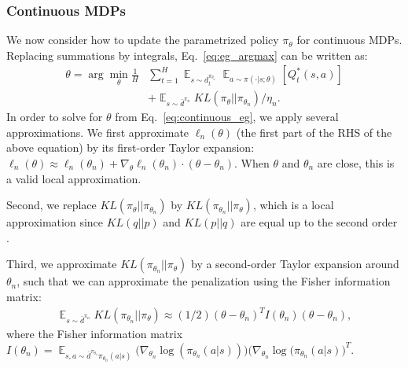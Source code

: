 \documentclass{article}
\begin{document}

\subsubsection{Continuous MDPs}
We now consider how to update the parametrized policy $\pi_{\theta}$ for continuous MDPs. Replacing summations by integrals, Eq.~\ref{eq:eg_argmax} can be written as:
\begin{align}
\label{eq:continuous_eg}
\theta = \arg\min_{\theta}\frac{1}{H}& \sum_{t=1}^H  \mathop{\mathbb{E}}_{s\sim d_t^{\pi_{\theta_n}}}\mathop{\mathbb{E}}_{a\sim\pi(\cdot|s;\theta)}[Q_t^*(s,a)] \nonumber\\
& + \mathop{\mathbb{E}}_{s\sim\bar{d}^{\pi_n}}KL(\pi_{\theta} ||\pi_{\theta_n})/\eta_{n}.
\end{align} 
In order to solve for $\theta$ from Eq.~\ref{eq:continuous_eg}, we apply several approximations. We first approximate $\ell_n(\theta)$ (the first part of the RHS of the above equation) by its first-order Taylor expansion: $\ell_n(\theta)\approx \ell_n(\theta_n) + \nabla_{\theta}\ell_n(\theta_n) \cdot (\theta - \theta_n)$. When $\theta$ and $\theta_n$ are close, this is a valid local approximation. 

Second, we replace $KL(\pi_{\theta}||\pi_{\theta_n})$ by $KL(\pi_{\theta_n}||\pi_{\theta})$, which is a local approximation since $KL(q||p)$ and $KL(p||q)$ are equal up to the second order \cite{kakade2002approximately,schulman2015trust}.

Third, we approximate $KL(\pi_{\theta_n}||\pi_{\theta})$ by a second-order Taylor expansion around $\theta_n$, such that we can approximate the penalization using the Fisher information matrix:
\begin{align}
\mathop{\mathbb{E}}_{s\sim\bar{d}^{\pi_n}}KL(\pi_{\theta_n} || \pi_{\theta}) \approx (1/2)(\theta - \theta_n)^T I(\theta_n)(\theta-\theta_n), \nonumber
\end{align} where the Fisher information matrix $I(\theta_n)=\mathop{\mathbb{E}}_{s,a\sim \bar{d}^{\pi_{\theta_n}}\pi_{\theta_n}(a|s)}\big(\nabla_{\theta_n}\log(\pi_{\theta_n}(a|s))\big)\big(\nabla_{\theta_n}\log(\pi_{\theta_n}(a|s)\big)^T$. 
\end{document}
